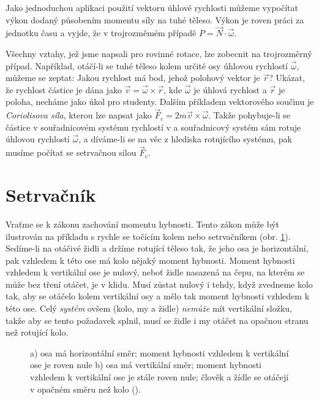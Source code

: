    Jako jednoduchou aplikaci použití vektoru úhlové rychlosti můžeme vypočítat výkon dodaný
    působením momentu síly na tuhé těleso. Výkon je roven práci za jednotku času a vyjde, že v
    trojrozměmém případě \(P=\vec{N}\cdot\vec{\omega}\).

    Všechny vztahy, jež jsme napsali pro rovinné rotace, lze zobecnit na trojrozměrný případ.
    Například, otáčí-li se tuhé těleso kolem určité osy úhlovou rychlostí \(\vec{\omega}\), můžeme
    se zeptat: Jakou rychlost má bod, jehož polohový vektor je \(\vec{r}\)? Ukázat, že rychlost
    částice je dána jako \(\vec{v} = \vec{\omega} \times \vec{r}\), kde \(\vec{\omega}\) je úhlová
    rychlost a \(\vec{r}\) je poloha, necháme jako úkol pro studenty. Dalším příkladem vektorového
    součìnu je \emph{Coriolisova síla}, kterou lze napsat jako \(\vec{F}_c =2m\vec{v} \times
    \vec{\omega}\). Takže pohybuje-li se částice v souřadnicovém systému rychlostí v a souřadnicový
    systém sám rotuje úhlovou rychlostí \(\vec{\omega}\), a díváme-li se na věc z hlediska
    rotujícího systému, pak musíme počítat se setrvačnou silou \(\vec{F}_c\).

  \section{Setrvačník}\label{fyz:IchapXXsecIII}
    Vraťme se k zákonu zachování momentu hybnosti. Tento zákon může být ilustrován na příkladu s
    rychle se točícím kolem nebo setrvačníkem (obr. \ref{fyz:fig406}). Sedíme-li na otáčivé židli a
    držíme rotující těleso tak, že jeho osa je horizontální, pak vzhledem k této ose má kolo nějaký
    moment hybnosti. Moment hybnosti vzhledem k vertikální ose je nulový, neboť židle nasazená na
    čepu, na kterém se může bez tření otáčet, je v klidu. Musí zůstat nulový i tehdy, když zvedneme
    kolo tak, aby se otáčelo kolem vertikální osy a mělo tak moment hybnosti vzhledem k této ose.
    Celý \emph{systém} ovšem (kolo, my a židle) \emph{nemůže} mít vertikální složku, takže aby se
    tento požadavek splnil, musí se židle i my otáčet na opačnou stranu než rotující kolo.

    \begin{figure}[ht!] %
      \centering
      \caption{a) osa má horizontální směr; moment hybnosti vzhledem k vertikální ose je roven nule 
              b) osa má vertikální směr; moment hybnosti vzhledem k vertikální ose je stále roven 
              nule; člověk a žídle se otáčejí v opačném směru než kolo
              (\cite[s.~278]{Feynman01}).}
      \label{fyz:fig406}
    \end{figure}

